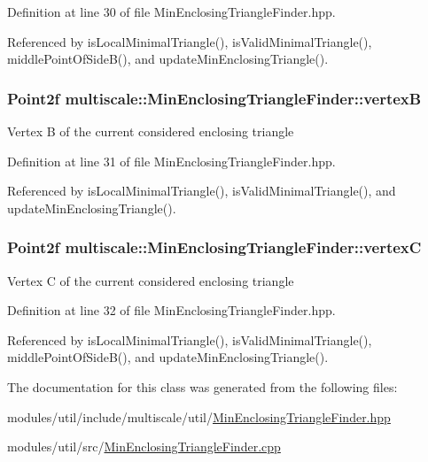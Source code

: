 Definition at line 30 of file Min\-Enclosing\-Triangle\-Finder.\-hpp.



Referenced by is\-Local\-Minimal\-Triangle(), is\-Valid\-Minimal\-Triangle(), middle\-Point\-Of\-Side\-B(), and update\-Min\-Enclosing\-Triangle().

\hypertarget{classmultiscale_1_1MinEnclosingTriangleFinder_a18e5ea5e0b341b3d02c4a75887f44c9c}{
\subsubsection[{vertex\-B}]{\setlength{\rightskip}{0pt plus 5cm}Point2f multiscale\-::\-Min\-Enclosing\-Triangle\-Finder\-::vertex\-B\hspace{0.3cm}{\ttfamily [private]}}}\label{classmultiscale_1_1MinEnclosingTriangleFinder_a18e5ea5e0b341b3d02c4a75887f44c9c}
Vertex B of the current considered enclosing triangle 

Definition at line 31 of file Min\-Enclosing\-Triangle\-Finder.\-hpp.



Referenced by is\-Local\-Minimal\-Triangle(), is\-Valid\-Minimal\-Triangle(), and update\-Min\-Enclosing\-Triangle().

\hypertarget{classmultiscale_1_1MinEnclosingTriangleFinder_a0fc6887251f73b19714f39888534cdaa}{
\subsubsection[{vertex\-C}]{\setlength{\rightskip}{0pt plus 5cm}Point2f multiscale\-::\-Min\-Enclosing\-Triangle\-Finder\-::vertex\-C\hspace{0.3cm}{\ttfamily [private]}}}\label{classmultiscale_1_1MinEnclosingTriangleFinder_a0fc6887251f73b19714f39888534cdaa}
Vertex C of the current considered enclosing triangle 

Definition at line 32 of file Min\-Enclosing\-Triangle\-Finder.\-hpp.



Referenced by is\-Local\-Minimal\-Triangle(), is\-Valid\-Minimal\-Triangle(), middle\-Point\-Of\-Side\-B(), and update\-Min\-Enclosing\-Triangle().



The documentation for this class was generated from the following files\-:\begin{DoxyCompactItemize}
\item 
modules/util/include/multiscale/util/\hyperlink{MinEnclosingTriangleFinder_8hpp}{Min\-Enclosing\-Triangle\-Finder.\-hpp}\item 
modules/util/src/\hyperlink{MinEnclosingTriangleFinder_8cpp}{Min\-Enclosing\-Triangle\-Finder.\-cpp}\end{DoxyCompactItemize}
